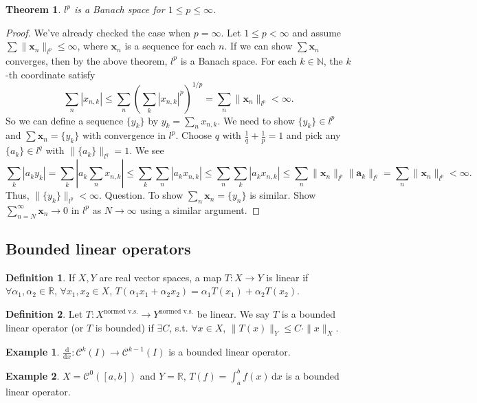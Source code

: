 \documentclass[12pt]{article}
\theoremstyle{plain}
\newtheorem{thm}{Theorem}
\theoremstyle{definition}
\newtheorem*{defn}{Definition}
\newtheorem*{eg}{Example}
\begin{document}
\begin{thm}
    $l^p$ is a Banach space for $1\leq p\leq \infty$.
\end{thm}
\begin{proof}
    We've already checked the case when $p=\infty$.
    Let $1\leq p<\infty$ and assume $\sum \|\bm{x}_n\|_{l^p} \leq \infty$, where $\bm{x}_n$ is a sequence for each $n$.
    If we can show $\sum \bm{x}_n$ converges, then by the above theorem, $l^p$ is a Banach space.
    For each $k\in\mathbb{N}$, the $k$-th coordinate satisfy
    \[
        \sum_n |x_{n,k}| \leq  \sum_n \left(\sum_k |x_{n,k}|^p\right)^{1/p} = \sum_n \|\bm{x}_n\|_{l^p} < \infty.
    \]
    So we can define a sequence $\{y_k\}$ by $y_k = \sum_n x_{n,k}$.
    We need to show $\{y_k\} \in l^p$ and $\sum \bm{x}_n = \{y_k\}$ with
    convergence in $l^p$.
    Choose $q$ with $\frac{1}{q} + \frac{1}{p} = 1$ and pick any $\{a_k\}\in l^q$ with $\|\{a_k\}\|_{l^q} = 1$.
    We see
    \[
        \sum_k |a_ky_k| = \sum_k \left| a_k \sum_n x_{n,k}\right| \leq \sum_k \sum_n |a_k x_{n,k}|
        \leq \sum_n \sum_k |a_k x_{n,k}|
        \leq \sum_n \|\bm{x}_n\|_{l^p}\|\bm{a}_k\|_{l^q}
        = \sum_n \|\bm{x}_n\|_{l^p}
        < \infty.
    \]
    Thus, $\|\{y_k\}\|_{l^p}<\infty$.
    Question.
    To show $\sum_n \bm{x}_n = \{y_n\}$ is similar.
    Show $\sum_{n=N}^\infty \bm{x}_n\rightarrow 0$ in $l^p$ as $N\rightarrow\infty$ using a similar argument.
\end{proof}

\subsection*{Bounded linear operators}
\begin{defn}
    If $X, Y$ are real vector spaces, a map $T: X\rightarrow Y$ is linear if $\forall \alpha_1, \alpha_2\in \mathbb{R}$,
    $\forall x_1, x_2\in X$, $T(\alpha_1 x_1 + \alpha_2 x_2) = \alpha_1 T(x_1) + \alpha_2 T(x_2)$.
\end{defn}

\begin{defn}
    Let $T: X^{\text{normed v.s.}}\rightarrow Y^{\text{normed v.s.}}$ be linear.
    We say $T$ is a bounded linear operator (or $T$ is bounded) if $\exists C$, s.t. $\forall x\in X$,
    $\|T(x)\|_Y\leq C\cdot\|x\|_X$.
\end{defn}

\begin{eg}
    $\frac{\mathrm{d}}{\mathrm{d}x}: \mathcal{C}^k(I) \rightarrow \mathcal{C}^{k-1}(I)$ is a bounded linear operator.
\end{eg}
\begin{eg}
    $X = \mathcal{C}^0([a,b])$ and $Y=\mathbb{R}$, $T(f) = \int_a^b f(x)\,\mathrm{d}x$ is a bounded linear operator.
\end{eg}
\end{document}
